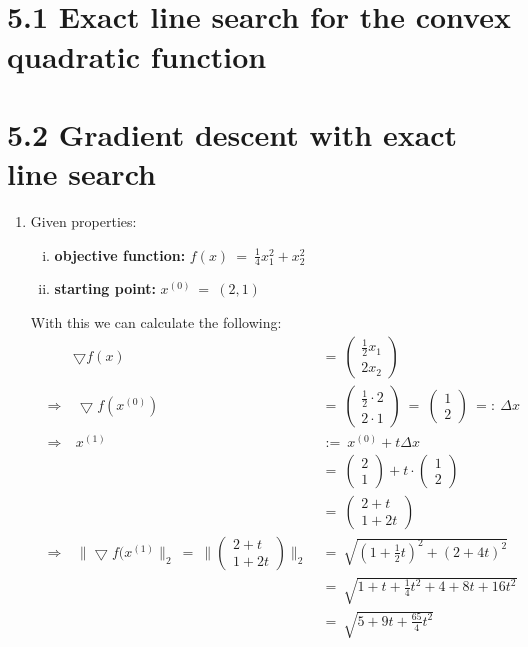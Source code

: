 \documentclass{report}
\begin{document}
	\pagestyle{fancy}
	\hfill \\ \\
	
	\section*{5.1 Exact line search for the convex quadratic function}
	\section*{5.2 Gradient descent with exact line search}
	\begin{enumerate}[]
		\item Given properties:
		\begin{enumerate}[(i)]
			\item \textbf{objective function:} $f(x) \ = \ \frac{1}{4} x_1^2 + x_2^2$
			\item \textbf{starting point:} $x^{(0)} \ = \ (2,1)$
		\end{enumerate}
		With this we can calculate the following:
		\begin{align*}
			& & \bigtriangledown f(x) \ & = \ \left(\begin{array}{c} \frac{1}{2} x_1 \\ 2 x_2 \end{array}\right) \\
			& \Rightarrow & \ \bigtriangledown f(x^{(0)}) \ & = \ \left(\begin{array}{c} \frac{1}{2} \cdot 2 \\ 2 \cdot 1 \end{array}\right) \  = \ \left(\begin{array}{c} 1 \\ 2 \end{array}\right) \ =: \ \Delta x \\
			& \Rightarrow & \ x^{(1)} \ & := \ x^{(0)}  + t \Delta x \\
			& & & = \ \left(\begin{array}{c} 2 \\ 1 \end{array}\right) + t \cdot \left(\begin{array}{c} 1 \\ 2 \end{array}\right) \\
			& & & = \ \left(\begin{array}{c} 2+t \\ 1+2t \end{array}\right) \\
			& \Rightarrow & \ \| \bigtriangledown f(x^{(1)} \| _2 \ = \ \| \left(\begin{array}{c} 2+t \\ 1+2t \end{array}\right) \| _2 \ & = \ \sqrt{(1+\frac{1}{2}t)^2 + (2+4t)^2} \\
			& & & = \ \sqrt{1+t+\frac{1}{4}t^2 + 4 + 8t + 16t^2} \\
			& & & = \ \sqrt{5 + 9t + \frac{65}{4}t^2}
		\end{align*}
		

\end{enumerate}
\end{document}
